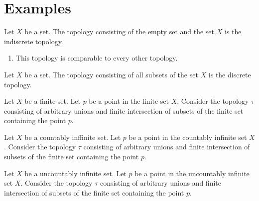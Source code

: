 \section{Examples}

\begin{example}
    \label{example-indiscrete}
    Let $X$ be a set.
    The topology consisting of the empty set and the set $X$ is the indiscrete topology.
\end{example}

\begin{remark}
    \label{remarks-indiscrete}
    \begin{enumerate}
        \item This topology is comparable to every other topology.
    \end{enumerate}
\end{remark}

\begin{example}
    \label{example-discrete}
    Let $X$ be a set.
    The topology consisting of all subsets of the set $X$ is the discrete topology.
\end{example}

\begin{example}
    \label{example-finite-particular-point}
    Let $X$ be a finite set.
    Let $p$ be a point in the finite set $X$.
    Consider the topology $\tau$ consisting of arbitrary unions and finite intersection of subsets of the finite set containing 
    the point $p$.
\end{example}

\begin{example}
    \label{example-countably-infinite-particular-point}
    Let $X$ be a countably inffinite set.
    Let $p$ be a point in the countably infinite set $X$.
    Consider the topology $\tau$ consisting of arbitrary unions and finite intersection of subsets of the finite set containing 
    the point $p$.
\end{example}

\begin{example}
    \label{example-uncountably-infinite-particular-point}
    Let $X$ be a uncountably infinite set.
    Let $p$ be a point in the uncountably infinite set $X$.
    Consider the topology $\tau$ consisting of arbitrary unions and finite intersection of subsets of the finite set containing 
    the point $p$.
\end{example}

